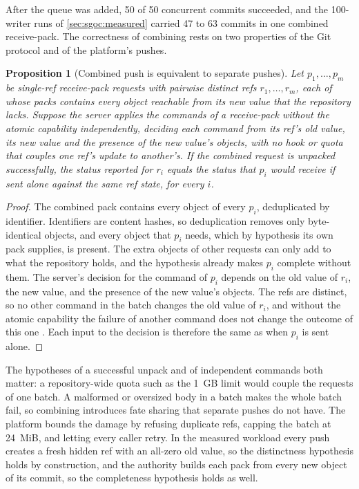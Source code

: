 \documentclass[11pt,letterpaper]{article}
\newtheorem{proposition}[theorem]{Proposition}
\theoremstyle{definition}
\theoremstyle{remark}
\begin{document}
After the queue was added, 50 of 50 concurrent commits succeeded, and the 100-writer runs of \cref{sec:sgoc:measured} carried 47 to 63 commits in one combined receive-pack. %
The correctness of combining rests on two properties of the Git protocol and of the platform's pushes.

\begin{proposition}[Combined push is equivalent to separate pushes]
\label{prop:sgoc:combined}
Let $p_1, \dots, p_m$ be single-ref receive-pack requests with pairwise distinct refs $r_1, \dots, r_m$, each of whose packs contains every object reachable from its new value that the repository lacks. Suppose the server applies the commands of a receive-pack without the atomic capability independently, deciding each command from its ref's old value, its new value and the presence of the new value's objects, with no hook or quota that couples one ref's update to another's. If the combined request is unpacked successfully, the status reported for $r_i$ equals the status that $p_i$ would receive if sent alone against the same ref state, for every $i$.
\end{proposition}

\begin{proof}
The combined pack contains every object of every $p_i$, deduplicated by identifier. Identifiers are content hashes, so deduplication removes only byte-identical objects, and every object that $p_i$ needs, which by hypothesis its own pack supplies, is present. The extra objects of other requests can only add to what the repository holds, and the hypothesis already makes $p_i$ complete without them. The server's decision for the command of $p_i$ depends on the old value of $r_i$, the new value, and the presence of the new value's objects. The refs are distinct, so no other command in the batch changes the old value of $r_i$, and without the atomic capability the failure of another command does not change the outcome of this one \cite{gitprotocol}. Each input to the decision is therefore the same as when $p_i$ is sent alone.
\end{proof}

The hypotheses of a successful unpack and of independent commands both matter: a repository-wide quota such as the 1~GB limit would couple the requests of one batch. A malformed or oversized body in a batch makes the whole batch fail, so combining introduces fate sharing that separate pushes do not have. The platform bounds the damage by refusing duplicate refs, capping the batch at 24~MiB, and letting every caller retry. In the measured workload every push creates a fresh hidden ref with an all-zero old value, so the distinctness hypothesis holds by construction, and the authority builds each pack from every new object of its commit, so the completeness hypothesis holds as well.
\end{document}
